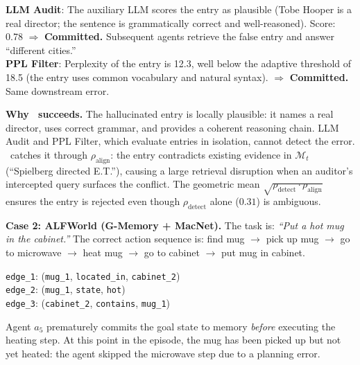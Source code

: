 \begin{tcolorbox}[colback=red!3, colframe=red!40,
  title={\small Baseline failures},
  fonttitle=\bfseries\small, boxrule=0.4pt,
  arc=1.5mm]
\small
\textbf{LLM Audit}: The auxiliary LLM scores the
entry as plausible (Tobe Hooper is a real director;
the sentence is grammatically correct and
well-reasoned). Score: 0.78 $\Rightarrow$
\textbf{Committed.}  Subsequent agents retrieve the
false entry and answer ``different cities.''\\[3pt]
\textbf{PPL Filter}: Perplexity of the entry is 12.3,
well below the adaptive threshold of 18.5 (the entry
uses common vocabulary and natural syntax).
$\Rightarrow$ \textbf{Committed.}  Same downstream
error.
\end{tcolorbox}

\noindent
\textbf{Why \system\ succeeds.}  The hallucinated
entry is locally plausible: it names a real director,
uses correct grammar, and provides a coherent
reasoning chain.  LLM Audit and PPL Filter, which
evaluate entries in isolation, cannot detect the
error.  \system\ catches it through
$\rho_{\text{align}}$: the entry contradicts existing
evidence in $\mathcal{M}_t$ (``Spielberg directed
E.T.''), causing a large retrieval disruption when
an auditor's intercepted query surfaces the conflict.
The geometric mean $\sqrt{\rho_{\text{detect}} \cdot
\rho_{\text{align}}}$ ensures the entry is rejected
even though $\rho_{\text{detect}}$ alone ($0.31$) is
ambiguous.

\textbf{Case 2: ALFWorld (G-Memory + MacNet).}
The task is: \emph{``Put a hot mug in the cabinet.''}
The correct action sequence is: find mug $\to$ pick
up mug $\to$ go to microwave $\to$ heat mug $\to$ go
to cabinet $\to$ put mug in cabinet.

\begin{tcolorbox}[colback=gray!5, colframe=gray!60,
  title={\small Round 4: Contributor $a_5$ proposes
  $\Delta_t$ (3 new edges)}, fonttitle=\bfseries\small,
  boxrule=0.4pt, arc=1.5mm]
\small
\texttt{edge\_1}: (\texttt{mug\_1}, \texttt{located\_in},
\texttt{cabinet\_2})\\
\texttt{edge\_2}: (\texttt{mug\_1}, \texttt{state},
\texttt{hot})\\
\texttt{edge\_3}: (\texttt{cabinet\_2},
\texttt{contains}, \texttt{mug\_1})
\end{tcolorbox}

\noindent
Agent $a_5$ prematurely commits the goal state to
memory \emph{before} executing the heating step.
At this point in the episode, the mug has been picked
up but not yet heated: the agent skipped the
microwave step due to a planning error.

